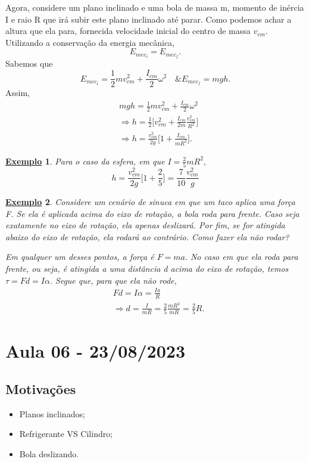 \documentclass{article}
\newtheorem{example}{\underline{Exemplo}}
\begin{document}
Agora, considere um plano inclinado e uma bola de massa m, momento de inércia I e raio R que irá subir este plano inclinado até parar. Como podemos achar a altura que ela para, 
fornecida velocidade inicial do centro de massa \(v_{cm}\). Utilizando a conservação da energia mecânica, 
\[
  E_{mec_{i}} = E_{mec_{f}}.
\]
Sabemos que 
\[
  E_{mec_{i}} = \frac{1}{2}mv_{cm}^{2} + \frac{I_{cm}}{2}\omega ^{2}\quad \& E_{mec_{f}} = mgh.
\]
Assim, 
\begin{align*}
    &mgh = \frac{1}{2} mv_{cm}^{2} + \frac{I_{cm}}{2}\omega^{2}\\
    &\Rightarrow h = \frac{1}{2}\biggl[v_{cm}^{2} + \frac{I_{cm}}{2m}\frac{v_{cm}^{2}}{R^{2}}\biggr]\\
    &\Rightarrow h = \frac{v_{cm}^{2}}{2g}\biggl[1 + \frac{I_{cm}}{mR^{2}}\biggr].
\end{align*}
\begin{example}
  Para o caso da esfera, em que \(I = \frac{2}{5}mR^{2},\) 
  \[
    h = \frac{v_{cm}^{2}}{2g}\biggl[1 + \frac{2}{5}\biggr] = \frac{7}{10}\frac{v_{cm}^{2}}{g}
  \]
\end{example}
\begin{example}
  Considere um cenário de sinuca em que um taco aplica uma força F. Se ela é aplicada acima do eixo de rotação, a bola roda para frente. Caso seja exatamente no eixo de rotação,
  ela apenas deslizará. Por fim, se for atingida abaixo do eixo de rotação, ela rodará ao contrário. Como fazer ela não rodar?

  Em qualquer um desses pontos, a força é \(F=ma.\) No caso em que ela roda para frente, ou seja, é atingida a uma distância d acima do eixo de rotação,
  temos \(\tau = Fd = I\alpha.\) Segue que, para que ela não rode, 
  \begin{align*}
  & Fd = I\alpha = \frac{Ia}{R}\\
  &\Rightarrow d = \frac{I}{mR} = \frac{2}{5}\frac{mR^{2}}{mR} = \frac{2}{5}R.
  \end{align*}
\end{example}
\newpage

\section{Aula 06 - 23/08/2023}
\subsection{Motivações}
\begin{itemize}
  \item Planos inclinados;
  \item Refrigerante VS Cilindro;
  \item Bola deslizando.
\end{itemize}
\end{document}
